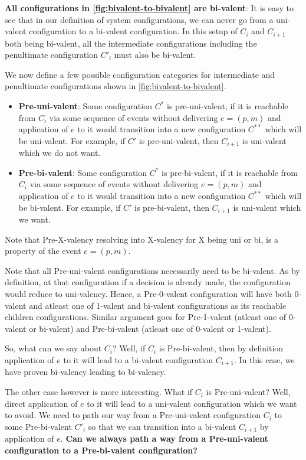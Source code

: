 \textbf{All configurations in \ref{fig:bivalent-to-bivalent} are bi-valent}: It is easy to see that in our definition of system configurations, we can never go from a uni-valent configuration to a bi-valent configuration. In this setup of $C_i$ and $C_{i+1}$ both being bi-valent, all the intermediate configurations including the penultimate configuration $C'_{i}$ must also be bi-valent.

We now define a few possible configuration categories for intermediate and penultimate configurations shown in \ref{fig:bivalent-to-bivalent}.

\begin{itemize}
    \item \textbf{Pre-uni-valent}: Some configuration $C^*$ is pre-uni-valent, if it is reachable from $C_i$ via some sequence of events without delivering $e = (p, m)$ and application of $e$ to it would transition into a new configuration $C^{**}$ which will be uni-valent. For example, if $C'$ is pre-uni-valent, then $C_{i+1}$ is uni-valent which we do not want.
    \item \textbf{Pre-bi-valent}: Some configuration $C^*$ is pre-bi-valent, if it is reachable from $C_i$ via some sequence of events without delivering $e = (p, m)$ and application of $e$ to it would transition into a new configuration $C^{**}$ which will be bi-valent. For example, if $C'$ is pre-bi-valent, then $C_{i+1}$ is uni-valent which we want.
\end{itemize}

Note that Pre-X-valency resolving into X-valency for X being uni or bi, is a property of the event $e = (p, m)$.

Note that all Pre-uni-valent configurations necessarily need to be bi-valent. As by definition, at that configuration if a decision is already made, the configuration would reduce to uni-valency. Hence, a Pre-0-valent configuration will have both 0-valent and atleast one of 1-valent and bi-valent configurations as its reachable children configurations. Similar argument goes for Pre-1-valent (atleast one of 0-valent or bi-valent) and Pre-bi-valent (atleast one of 0-valent or 1-valent).

So, what can we say about $C_i$? Well, if $C_i$ is Pre-bi-valent, then by definition application of $e$ to it will lead to a bi-valent configuration $C_{i+1}$. In this case, we have proven bi-valency leading to bi-valency.

The other case however is more interesting. What if $C_i$ is Pre-uni-valent? Well, direct application of $e$ to it will lead to a uni-valent configuration which we want to avoid. We need to path our way from a Pre-uni-valent configuration $C_i$ to some Pre-bi-valent $C'_{i}$ so that we can transition into a bi-valent $C_{i+1}$ by application of $e$. \textbf{Can we always path a way from a Pre-uni-valent configuration to a Pre-bi-valent configuration?}


